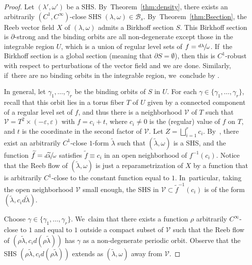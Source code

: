 \documentclass[JEP,XML,SOM,Unicode,NoEqCountersInSection,NoFloatCountersInSection,published]{cedram}
\theoremstyle{definition}
\begin{document}
\begin{proof}
Let $(\lambda',\omega')$ be a SHS. By~Theorem~\ref{thm:density}, there exists an arbitrarily $(C^1,C^\infty)$-close SHS $(\lambda,\omega) \in \mathcal{B}_s$. By~Theorem~\ref{thm:Bsection}, the Reeb vector field $X$ of $(\lambda,\omega)$ admits a Birkhoff section $S$. This Birkhoff section is $\partial$-strong and the binding orbits are all non-degenerate except those in the integrable region $U$, which is a union of regular level sets of $f=\sfrac{d\lambda}{\omega}$. If~the Birkhoff section is a global section (meaning that $\partial S=\emptyset$), then this is $C^1$-robust with respect to perturbations of the vector field and we are done. Similarly, if~there are no binding orbits in the integrable region, we~conclude by \cite[\S 5]{CDHR}.

In general, let $\gamma_1,\dots, \gamma_r$ be the binding orbits of $S$ in $U$. For each $\gamma\in \{\gamma_1,\dots, \gamma_r\}$, recall that this orbit lies in a torus fiber $T$ of $U$ given by a connected component of a regular level set of $f$, and thus there is a neighborhood $\mathcal{V}$ of $T$ such that $\mathcal{V}=T^2\times (-\varepsilon,\varepsilon)$ with $f=c_i+t$, where $c_i\neq 0$ is the (regular) value of $f$ on $T$, and $t$ is the coordinate in the second factor of $\mathcal{V}$. Let $Z=\bigsqcup_{i=1}^r c_i$. By~\cite[Prop.\,3.23]{CV1}, there exist an arbitrarily $C^1$-close $1$-form $\widetilde \lambda$ such that $(\widetilde \lambda, \omega)$ is a SHS, and the function $\widetilde f=\sfrac{d\widetilde \lambda}{\omega}$ satisfies $\widetilde f\equiv c_i$ in an open neighborhood of $f^{-1}(c_i)$. Notice that the Reeb flow of $(\widetilde \lambda, \omega)$ is just a reparametrization of $X$ by a function that is arbitrarily $C^1$-close to the constant function equal to $1$. In~particular, taking the open neighborhood $\mathcal{V}$ small enough, the SHS in $\mathcal{V}\subset \widetilde f^{-1}(c_i)$ is of the form $(\widetilde \lambda, c_i d\widetilde \lambda)$.\enlargethispage{.5\baselineskip}%

Choose $\gamma \in \{\gamma_1,\ldots, \gamma_r\}$. We~claim that there exists a function $\rho$ arbitrarily $C^\infty$\nobreakdash-close to $1$ and equal to $1$ outside a compact subset of $\mathcal V$ such that the Reeb flow of $(\rho\widetilde \lambda, c_i d (\rho \widetilde \lambda))$ has $\gamma$ as a non-degenerate periodic orbit. Observe that the SHS $(\rho\widetilde \lambda, c_i d (\rho \widetilde \lambda))$ extends as $(\widetilde \lambda, \omega)$ away from $\mathcal V$.


\end{proof}
\end{document}
